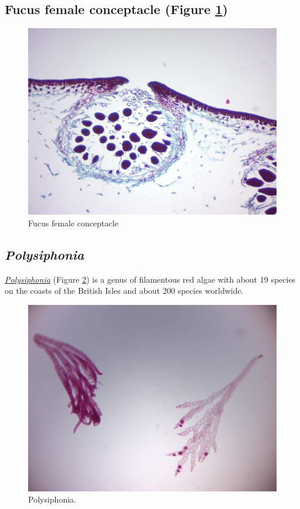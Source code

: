 \subsection{Fucus female conceptacle (Figure
\ref{fig:femalefucus})}\label{fucus-female-conceptacle-figure-reffigfemalefucus}

\begin{figure}

{\centering \includegraphics[width=0.7\linewidth]{./figures/protists/female_fucus} 

}

\caption{Fucus female conceptacle}\label{fig:femalefucus}
\end{figure}

\subsection{\texorpdfstring{\emph{Polysiphonia}}{Polysiphonia}}\label{polysiphonia}

\href{https://en.wikipedia.org/wiki/Polysiphonia}{\emph{Polysiphonia}}
(Figure \ref{fig:polysiphonia}) is a genus of filamentous red algae with
about 19 species on the coasts of the British Isles and about 200
species worldwide.

\begin{figure}

{\centering \includegraphics[width=0.7\linewidth]{./figures/protists/Polysiphonia_prepared} 

}

\caption{Polysiphonia.}\label{fig:polysiphonia}
\end{figure}


